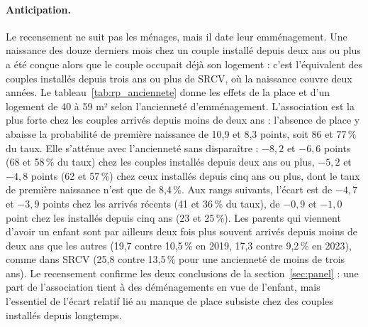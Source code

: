 \documentclass[11pt,a4paper]{article}
\theoremstyle{plain}
\theoremstyle{definition}
\theoremstyle{remark}
\begin{document}
\paragraph{Anticipation.} Le recensement ne suit pas les ménages, mais il date leur emménagement. Une naissance des douze derniers mois chez un couple installé depuis deux ans ou plus a été conçue alors que le couple occupait déjà son logement : c'est l'équivalent des couples installés depuis trois ans ou plus de SRCV, où la naissance couvre deux années. Le tableau~\ref{tab:rp_anciennete} donne les effets de la place et d'un logement de 40 à 59 m² selon l'ancienneté d'emménagement. L'association est la plus forte chez les couples arrivés depuis moins de deux ans : l'absence de place y abaisse la probabilité de première naissance de 10,9 et 8,3 points, soit 86 et 77\,\% du taux. Elle s'atténue avec l'ancienneté sans disparaître : $-8{,}2$ et $-6{,}6$ points (68 et 58\,\% du taux) chez les couples installés depuis deux ans ou plus, $-5{,}2$ et $-4{,}8$ points (62 et 57\,\%) chez ceux installés depuis cinq ans ou plus, dont le taux de première naissance n'est que de 8,4\,\%. Aux rangs suivants, l'écart est de $-4{,}7$ et $-3{,}9$ points chez les arrivés récents (41 et 36\,\% du taux), de $-0{,}9$ et $-1{,}0$ point chez les installés depuis cinq ans (23 et 25\,\%). Les parents qui viennent d'avoir un enfant sont par ailleurs deux fois plus souvent arrivés depuis moins de deux ans que les autres (19,7 contre 10,5\,\% en 2019, 17,3 contre 9,2\,\% en 2023), comme dans SRCV (25,8 contre 13,5\,\% pour une ancienneté de moins de trois ans). Le recensement confirme les deux conclusions de la section~\ref{sec:panel} : une part de l'association tient à des déménagements en vue de l'enfant, mais l'essentiel de l'écart relatif lié au manque de place subsiste chez des couples installés depuis longtemps.
\end{document}
